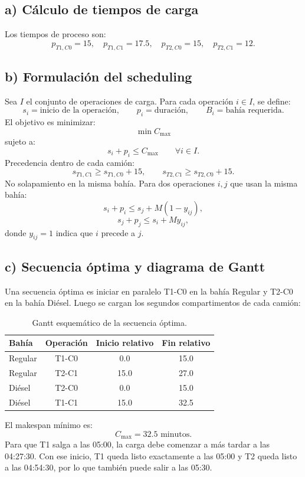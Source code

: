 \documentclass[11pt,letterpaper]{article}
\begin{document}
\subsection{a) Cálculo de tiempos de carga}

Los tiempos de proceso son:
\[
p_{T1,C0}=15,\quad
p_{T1,C1}=17.5,\quad
p_{T2,C0}=15,\quad
p_{T2,C1}=12.
\]

\subsection{b) Formulación del scheduling}

Sea \(I\) el conjunto de operaciones de carga. Para cada operación \(i\in I\), se define:
\[
    s_i=\text{inicio de la operación},\qquad
    p_i=\text{duración},\qquad
    B_i=\text{bahía requerida}.
\]
El objetivo es minimizar:
\[
    \min C_{\max}
\]
sujeto a:
\[
    s_i+p_i\le C_{\max}\qquad \forall i\in I.
\]
Precedencia dentro de cada camión:
\[
    s_{T1,C1}\ge s_{T1,C0}+15,
    \qquad
    s_{T2,C1}\ge s_{T2,C0}+15.
\]
No solapamiento en la misma bahía. Para dos operaciones \(i,j\) que usan la misma bahía:
\[
    s_i+p_i\le s_j+M(1-y_{ij}),
\]
\[
    s_j+p_j\le s_i+My_{ij},
\]
donde \(y_{ij}=1\) indica que \(i\) precede a \(j\).

\subsection{c) Secuencia óptima y diagrama de Gantt}

Una secuencia óptima es iniciar en paralelo T1-C0 en la bahía Regular y T2-C0 en la bahía
Diésel. Luego se cargan los segundos compartimentos de cada camión:

\begin{table}[h]
\centering
\begin{tabular}{lccc}
\toprule
\textbf{Bahía} & \textbf{Operación} & \textbf{Inicio relativo} & \textbf{Fin relativo} \\
\midrule
Regular & T1-C0 & 0.0 & 15.0 \\
Regular & T2-C1 & 15.0 & 27.0 \\
Diésel & T2-C0 & 0.0 & 15.0 \\
Diésel & T1-C1 & 15.0 & 32.5 \\
\bottomrule
\end{tabular}
\caption{Gantt esquemático de la secuencia óptima.}
\end{table}

El makespan mínimo es:
\[
    C_{\max}=32.5\text{ minutos}.
\]
Para que T1 salga a las 05:00, la carga debe comenzar a más tardar a las 04:27:30. Con ese
inicio, T1 queda listo exactamente a las 05:00 y T2 queda listo a las 04:54:30, por lo que
también puede salir a las 05:30.
\end{document}
